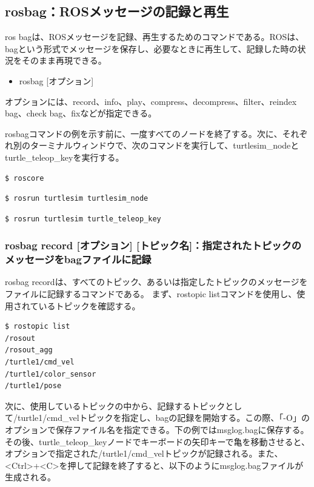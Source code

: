 \subsection{rosbag：ROSメッセージの記録と再生}

ros bagは、ROSメッセージを記録、再生するためのコマンドである。ROSは、bagという形式でメッセージを保存し、必要なときに再生して、記録した時の状況をそのまま再現できる。

\begin{itemize}
\item rosbag [オプション]
\end{itemize}

オプションには、record、info、play、compress、decompress、filter、reindex bag、check bag、fixなどが指定できる。

rosbagコマンドの例を示す前に、一度すべてのノードを終了する。次に、それぞれ別のターミナルウィンドウで、次のコマンドを実行して、turtlesim\_nodeとturtle\_teleop\_keyを実行する。

\begin{lstlisting}[language=ROS]
$ roscore
\end{lstlisting}

\begin{lstlisting}[language=ROS]
$ rosrun turtlesim turtlesim_node
\end{lstlisting}

\begin{lstlisting}[language=ROS]
$ rosrun turtlesim turtle_teleop_key
\end{lstlisting}


\subsubsection{rosbag record [オプション] [トピック名]：指定されたトピックのメッセージをbagファイルに記録}

rosbag recordは、すべてのトピック、あるいは指定したトピックのメッセージをファイルに記録するコマンドである。
まず、rostopic listコマンドを使用し、使用されているトピックを確認する。

\begin{lstlisting}[language=ROS]
$ rostopic list
/rosout
/rosout_agg
/turtle1/cmd_vel
/turtle1/color_sensor
/turtle1/pose
\end{lstlisting}

次に、使用しているトピックの中から、記録するトピックとして/turtle1/cmd\_velトピックを指定し、bagの記録を開始する。この際、「-O」のオプションで保存ファイル名を指定できる。下の例ではmsglog.bagに保存する。その後、turtle\_teleop\_keyノードでキーボードの矢印キーで亀を移動させると、オプションで指定された/turtle1/cmd\_velトピックが記録される。また、<Ctrl>+<C>を押して記録を終了すると、以下のようにmsglog.bagファイルが生成される。

